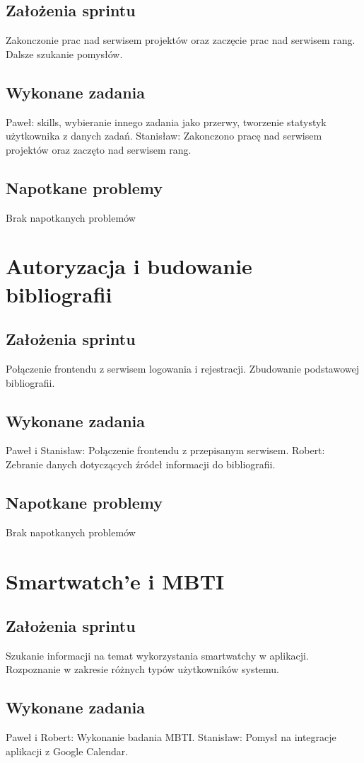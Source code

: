 \documentclass[a4paper,11pt]{report}
\begin{document}
\subsection {Założenia sprintu}
Zakonczonie prac nad serwisem projektów oraz zaczęcie prac nad serwisem rang. Dalsze szukanie pomysłów.
\subsection {Wykonane zadania}
Paweł: skills, wybieranie innego zadania jako przerwy, tworzenie statystyk użytkownika z danych zadań.
Stanisław: Zakonczono pracę nad serwisem projektów oraz zaczęto nad serwisem rang.
\subsection {Napotkane problemy}
Brak napotkanych problemów

\section {Autoryzacja i budowanie bibliografii}
\subsection {Założenia sprintu}
Połączenie frontendu z serwisem logowania i rejestracji. Zbudowanie podstawowej bibliografii.
\subsection {Wykonane zadania}
Paweł i Stanisław: Połączenie frontendu z przepisanym serwisem.
Robert: Zebranie danych dotyczących źródeł informacji do bibliografii.
\subsection {Napotkane problemy}
Brak napotkanych problemów

\section {Smartwatch'e i MBTI}
\subsection {Założenia sprintu}
Szukanie informacji na temat wykorzystania smartwatchy w aplikacji. Rozpoznanie w zakresie różnych typów użytkowników systemu. 
\subsection {Wykonane zadania}
Paweł i Robert: Wykonanie badania MBTI.
Stanisław: Pomysł na integracje aplikacji z Google Calendar.
\end{document}
